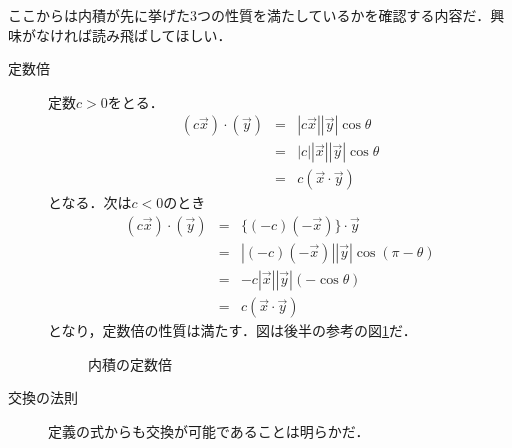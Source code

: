     ここからは内積が先に挙げた3つの性質を満たしているかを確認する内容だ．興味がなければ読み飛ばしてほしい．
    \begin{description}
        \item[定数倍] 定数$c>0$をとる．
        \begin{eqnarray*}
            (c\vec{x})\cdot(\vec{y})&=&|c\vec{x}||\vec{y}|\cos\theta\\
            &=&|c||\vec{x}||\vec{y}|\cos\theta\\
            &=&c(\vec{x}\cdot\vec{y})
        \end{eqnarray*}
        となる．次は$c<0$のとき
        \begin{eqnarray*}
            (c\vec{x})\cdot(\vec{y})&=& \{(-c)(-\vec{x})\}\cdot\vec{y}\\
            &=& |(-c)(-\vec{x})||\vec{y}|\cos(\pi-\theta)\\
            &=&-c|\vec{x}||\vec{y}|(-\cos\theta)\\
            &=&c(\vec{x}\cdot\vec{y})
        \end{eqnarray*}
        となり，定数倍の性質は満たす．図は後半の参考の図\ref{fig:vector_naiseki_tesubai}だ．
        \begin{figure}[htbp]
            \begin{center}
            \end{center}
            \caption{内積の定数倍}
            \label{fig:vector_naiseki_tesubai}
        \end{figure}
        \item[交換の法則] 定義の式からも交換が可能であることは明らかだ．

\end{description}
